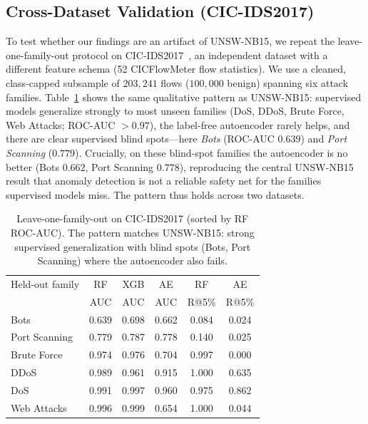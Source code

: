 \documentclass[conference]{IEEEtran}
\begin{document}
\subsection{Cross-Dataset Validation (CIC-IDS2017)}\label{sec:crossdataset}
To test whether our findings are an artifact of UNSW-NB15, we repeat the
leave-one-family-out protocol on CIC-IDS2017~\cite{cicids2017}, an independent dataset
with a different feature schema (52 CICFlowMeter flow statistics). We use a cleaned, class-capped
subsample of $203{,}241$ flows ($100{,}000$ benign) spanning six attack families.
Table~\ref{tab:cicids} shows the same qualitative pattern as UNSW-NB15: supervised
models generalize strongly to most unseen families (DoS, DDoS, Brute Force, Web
Attacks; ROC-AUC $>0.97$), the label-free autoencoder rarely helps, and there are
clear supervised blind spots---here \emph{Bots} (ROC-AUC $0.639$) and \emph{Port
Scanning} ($0.779$). Crucially, on these blind-spot families the autoencoder is no
better (Bots $0.662$, Port Scanning $0.778$), reproducing the central UNSW-NB15
result that anomaly detection is not a reliable safety net for the families
supervised models miss. The pattern thus holds across two datasets.

\begin{table}[t]
\caption{Leave-one-family-out on CIC-IDS2017 (sorted by RF ROC-AUC). The pattern
matches UNSW-NB15: strong supervised generalization with blind spots (Bots, Port
Scanning) where the autoencoder also fails.}
\label{tab:cicids}
\centering
\small
\begin{tabular}{lccccc}
\toprule
Held-out family & RF & XGB & AE & RF & AE \\
 & AUC & AUC & AUC & R@5\% & R@5\% \\
\midrule
Bots          & 0.639 & 0.698 & 0.662 & 0.084 & 0.024 \\
Port Scanning & 0.779 & 0.787 & 0.778 & 0.140 & 0.025 \\
Brute Force   & 0.974 & 0.976 & 0.704 & 0.997 & 0.000 \\
DDoS          & 0.989 & 0.961 & 0.915 & 1.000 & 0.635 \\
DoS           & 0.991 & 0.997 & 0.960 & 0.975 & 0.862 \\
Web Attacks   & 0.996 & 0.999 & 0.654 & 1.000 & 0.044 \\
\bottomrule
\end{tabular}
\end{table}
\end{document}
